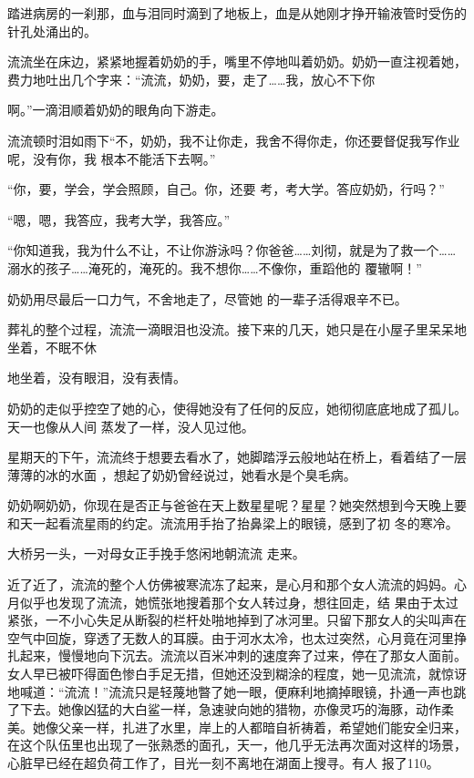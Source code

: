 \documentclass{article}
\begin{document}
踏进病房的一刹那，血与泪同时滴到了地板上，血是从她刚才挣开输液管时受伤的针孔处涌出的。

流流坐在床边，紧紧地握着奶奶的手，嘴里不停地叫着奶奶。奶奶一直注视着她，费力地吐出几个字来：“流流，奶奶，要，走了……我，放心不下你
\newpage

啊。”一滴泪顺着奶奶的眼角向下游走。 

流流顿时泪如雨下“不，奶奶，我不让你走，我舍不得你走，你还要督促我写作业呢，没有你，我
根本不能活下去啊。” 

“你，要，学会，学会照顾，自己。你，还要
考，考大学。答应奶奶，行吗？” 


“嗯，嗯，我答应，我考大学，我答应。” 

“你知道我，我为什么不让，不让你游泳吗？你爸爸……刘彻，就是为了救一个……溺水的孩子……淹死的，淹死的。我不想你……不像你，重蹈他的
覆辙啊！” 

奶奶用尽最后一口力气，不舍地走了，尽管她
的一辈子活得艰辛不已。 

葬礼的整个过程，流流一滴眼泪也没流。接下来的几天，她只是在小屋子里呆呆地坐着，不眠不休
\newpage

地坐着，没有眼泪，没有表情。 

奶奶的走似乎控空了她的心，使得她没有了任何的反应，她彻彻底底地成了孤儿。天一也像从人间
蒸发了一样，没人见过他。 

星期天的下午，流流终于想要去看水了，她脚踏浮云般地站在桥上，看着结了一层薄薄的冰的水面
，想起了奶奶曾经说过，她看水是个臭毛病。 

奶奶啊奶奶，你现在是否正与爸爸在天上数星星呢？星星？她突然想到今天晚上要和天一起看流星雨的约定。流流用手抬了抬鼻梁上的眼镜，感到了初
冬的寒冷。 

大桥另一头，一对母女正手挽手悠闲地朝流流
走来。 

近了近了，流流的整个人仿佛被寒流冻了起来，是心月和那个女人流流的妈妈。心月似乎也发现了流流，她慌张地搜着那个女人转过身，想往回走，结
\newpage
果由于太过紧张，一不小心失足从断裂的栏杆处啪地掉到了冰河里。只留下那女人的尖叫声在空气中回旋，穿透了无数人的耳膜。由于河水太冷，也太过突然，心月竟在河里挣扎起来，慢慢地向下沉去。流流以百米冲刺的速度奔了过来，停在了那女人面前。女人早已被吓得面色惨白手足无措，但她还没到糊涂的程度，她一见流流，就惊讶地喊道：“流流！”流流只是轻蔑地暼了她一眼，便麻利地摘掉眼镜，扑通一声也跳了下去。她像凶猛的大白鲨一样，急速驶向她的猎物，亦像灵巧的海豚，动作柔美。她像父亲一样，扎进了水里，岸上的人都暗自祈祷着，希望她们能安全归来，在这个队伍里也出现了一张熟悉的面孔，天一，他几乎无法再次面对这样的场景，心脏早已经在超负荷工作了，目光一刻不离地在湖面上搜寻。有人
报了110。 
\end{document}
